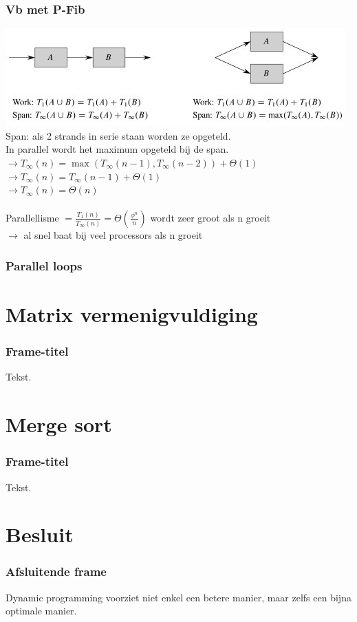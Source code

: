 \documentclass
   [kulak] %
   {kulakbeamer}
\begin{document}
\begin{frame}
	\frametitle{Vb met P-Fib}
	\includegraphics[width=\textwidth]{fig3.jpg}
	\\Span: als 2 strands in serie staan worden ze opgeteld. \\ In parallel wordt het maximum opgeteld bij de span. \pause \\
	$\rightarrow T_\infty (n) = \max(T_\infty (n-1),T_\infty (n-2)) + \Theta(1)$\\
	$\rightarrow T_\infty (n) = T_\infty (n-1) + \Theta(1)$ \\
	$\rightarrow T_\infty (n) = \Theta(n)$\\~\\
	\pause 
	Parallellisme $= \frac{T_1 (n)}{T_\infty (n)} = \Theta(\frac{\phi^n}{n})$ wordt zeer groot als n groeit \\$\rightarrow$ al snel baat bij veel processors als n groeit
	
\end{frame}

\begin{frame}
	\frametitle{Parallel loops}
\end{frame}

\section[Matrix]{Matrix vermenigvuldiging}

\begin{frame}
	\frametitle{Frame-titel}
	Tekst.
\end{frame}

\section[Merge sort]{Merge sort}

\begin{frame}
	\frametitle{Frame-titel}
	Tekst.
\end{frame}

\section{Besluit}
\begin{frame}
\frametitle{Afsluitende frame}
Dynamic programming voorziet niet enkel een betere manier, maar zelfs een bijna optimale manier.
\end{frame}
\end{document}
